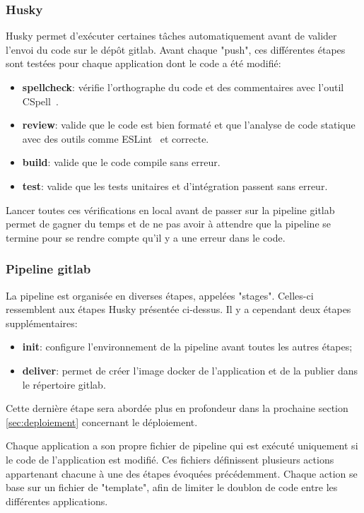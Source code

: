 \subsubsection{Husky}

Husky permet d'exécuter certaines tâches automatiquement avant de valider l'envoi du code sur le dépôt \gls{gitlab}. Avant chaque "push", ces différentes étapes sont testées pour chaque application dont le code a été modifié:

\begin{itemize}
  \item \textbf{spellcheck}: vérifie l'orthographe du code et des commentaires avec l'outil CSpell~\cite{cspell}.
  \item \textbf{review}: valide que le code est bien formaté et que l'analyse de code statique avec des outils comme ESLint~\cite{eslint} et correcte.
  \item \textbf{build}: valide que le code compile sans erreur.
  \item \textbf{test}: valide que les tests unitaires et d'intégration passent sans erreur.
\end{itemize}

Lancer toutes ces vérifications en local avant de passer sur la pipeline \gls{gitlab} permet de gagner du temps et de ne pas avoir à attendre que la pipeline se termine pour se rendre compte qu'il y a une erreur dans le code.

\subsubsection{Pipeline \gls{gitlab}}

La pipeline est organisée en diverses étapes, appelées "stages". Celles-ci ressemblent aux étapes Husky présentée ci-dessus. Il y a cependant deux étapes supplémentaires:

\begin{itemize}
  \item \textbf{init}: configure l'environnement de la pipeline avant toutes les autres étapes;
  \item \textbf{deliver}: permet de créer l'image \gls{docker} de l'application et de la publier dans le répertoire \gls{gitlab}.
\end{itemize}

Cette dernière étape sera abordée plus en profondeur dans la prochaine section \ref{sec:deploiement} concernant le déploiement.

Chaque application a son propre fichier de pipeline qui est exécuté uniquement si le code de l'application est modifié. Ces fichiers définissent plusieurs actions appartenant chacune à une des étapes évoquées précédemment. Chaque action se base sur un fichier de "template", afin de limiter le doublon de code entre les différentes applications.

